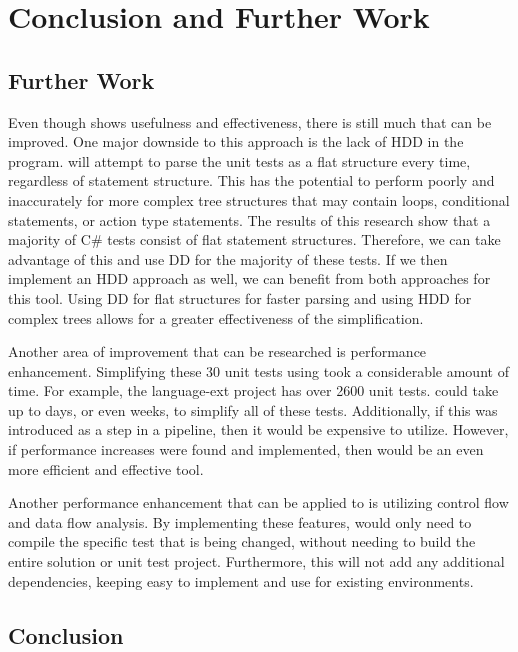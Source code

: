 \clearpage %

\chapter{Conclusion and Further Work}\label{CH8_Conclusion}

\section{Further Work}

Even though \mytool shows usefulness and effectiveness, there is still much that can be improved. One major downside to this approach is the lack of HDD in the program. \mytool will attempt to parse the unit tests as a flat structure every time, regardless of statement structure. This has the potential to perform poorly and inaccurately for more complex tree structures that may contain loops, conditional statements, or action type statements. The results of this research show that a majority of C\# tests consist of flat statement structures. Therefore, we can take advantage of this and use DD for the majority of these tests. If we then implement an HDD approach as well, we can benefit from both approaches for this tool. Using DD for flat structures for faster parsing and using HDD for complex trees allows for a greater effectiveness of the simplification. 

Another area of improvement that can be researched is performance enhancement. Simplifying these 30 unit tests using \mytool took a considerable amount of time. For example, the language-ext project has over 2600 unit tests. \mytool could take up to days, or even weeks, to simplify all of these tests. Additionally, if this was introduced as a step in a pipeline, then it would be expensive to utilize. However, if performance increases were found and implemented, then \mytool would be an even more efficient and effective tool.

Another performance enhancement that can be applied to \mytool is utilizing control flow and data flow analysis. By implementing these features, \mytool would only need to compile the specific test that is being changed, without needing to build the entire solution or unit test project. Furthermore, this will not add any additional dependencies, keeping \mytool easy to implement and use for existing environments.

\section{Conclusion}

